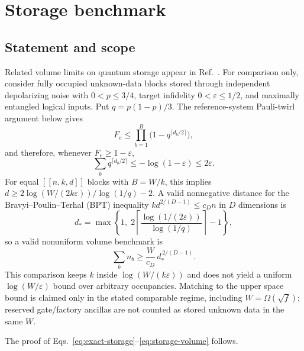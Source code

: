 \documentclass[aps,prx,reprint,superscriptaddress,nofootinbib,floatfix,longbibliography]{revtex4-2}
\theoremstyle{definition}
\begin{document}
\section{Storage benchmark}\label{app:storage-details}
\subsection{Statement and scope}\label{sec:lower}
Related volume limits on quantum storage appear in Ref.~\cite{FlammiaStorage}.
For comparison only, consider fully occupied unknown-data blocks stored through
independent depolarizing noise with $0<p\leq3/4$, target infidelity
$0<\varepsilon\leq1/2$, and maximally entangled logical inputs.  Put
$q=p(1-p)/3$.  The reference-system Pauli-twirl argument below gives
\begin{equation}
 F_e\leq\prod_{b=1}^{B}\bigl(1-q^{\lceil d_b/2\rceil}\bigr),
 \label{eq:exact-storage}
\end{equation}
and therefore, whenever $F_e\geq1-\varepsilon$,
\begin{equation}
 \sum_b q^{\lceil d_b/2\rceil}\leq-\log(1-\varepsilon)\leq2\varepsilon.
 \label{eq:sum-storage}
\end{equation}
For equal $[[n,k,d]]$ blocks with $B=W/k$, this implies
$d\geq2\log(W/(2k\varepsilon))/\log(1/q)-2$.  A valid nonnegative distance
for the Bravyi--Poulin--Terhal (BPT) inequality $kd^{2/(D-1)}\le c_Dn$ in $D$
dimensions is
\begin{equation}
 d_* = \max\left\{1,\;2\left\lceil\frac{\log(1/(2\varepsilon))}{\log(1/q)}\right\rceil-1\right\},
 \label{eq:distance-floor}
\end{equation}
so a valid nonuniform volume benchmark is
\begin{equation}
 \sum_b n_b\geq \frac{W}{c_D}\,d_*^{\,2/(D-1)}.
 \label{eq:storage-volume}
\end{equation}
This comparison keeps $k$ inside
$\log(W/(k\varepsilon))$ and does not yield a uniform
$\log(W/\varepsilon)$ bound over arbitrary occupancies.  Matching to the
upper space bound is claimed only in the stated comparable regime, including
$W=\Omega(\sqrt f)$; reserved gate/factory ancillas are not counted as stored
unknown data in the same $W$.



The proof of Eqs.~\eqref{eq:exact-storage}--\eqref{eq:storage-volume} follows.
\end{document}
